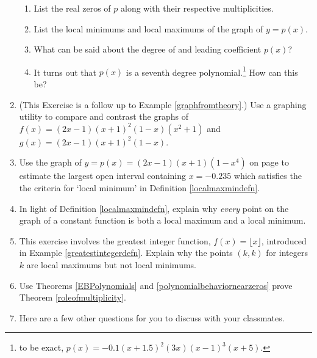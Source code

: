 \documentclass{ximera}
\begin{document}
\begin{enumerate}
\begin{enumerate}
\item  List the real zeros of $p$ along with their respective multiplicities.  

\item  List the local minimums and local maximums of the graph of $y = p(x)$.

\item  What can be said about the degree of and leading coefficient $p(x)$?

\item  It turns out that $p(x)$ is a seventh degree polynomial.\footnote{to be exact, $p(x) = -0.1\left(x+1.5\right)^2\left(3x\right)\left(x-1\right)^3\left(x+5\right)$.}  How can this be?

\end{enumerate}

\item  \label{comparegraphfromtheoryexample}  (This Exercise is a follow up to Example \ref{graphfromtheory}.)  Use a graphing utility to  compare and contrast the graphs of $f(x) = (2x-1)(x+1)^2(1-x)(x^2+1)$ and $g(x) = (2x-1)(x+1)^2(1-x)$.

\item Use the graph of $y= p(x) = (2x-1)(x+1)(1-x^4)$ on page \pageref{localmaxminexample} to estimate the largest open interval containing $x = -0.235$ which satisfies the the criteria for `local minimum'  in Definition \ref{localmaxmindefn}.

\item  In light of Definition \ref{localmaxmindefn}, explain why \textit{every} point on the graph of a constant function is both a local maximum and a local minimum.

\item This exercise involves the greatest integer function, $f(x) = \lfloor x \rfloor$,  introduced in Example \ref{greatestintegerdefn}.  Explain why the points $(k,k)$ for integers $k$ are local maximums but not local minimums.

\item  Use Theorems  \ref{EBPolynomials}  and \ref{polynomialbehaviornearzeros} prove Theorem \ref{roleofmultiplicity}.


\newpage

\item Here are a few other questions for you to discuss with your classmates.  

\begin{enumerate}


\end{enumerate}
\end{enumerate}
\end{document}
